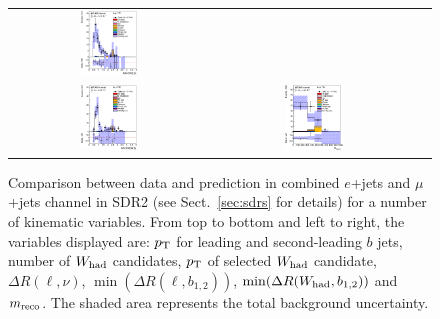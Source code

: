 \begin{figure}[htbp]
\begin{center}
\begin{tabular}{ccc}
\includegraphics[width=0.30\textwidth]{appendices/figures/sdrs/VLQAna_WbX_MinDRlb_ELEMUONCR1_1W_NOMINAL.eps} \\
\includegraphics[width=0.30\textwidth]{appendices/figures/sdrs/VLQAna_WbX_MinDRWb_ELEMUONCR1_1W_NOMINAL.eps} &
\includegraphics[width=0.30\textwidth]{appendices/figures/sdrs/VLQAna_WbX_1W_MWb_4_ELEMUONCR1_1W_NOMINAL.eps} & \\
\end{tabular}\caption{\small {Comparison between data and prediction in combined $e$+jets and $\mu$+jets channel in SDR2 (see Sect.~\ref{sec:sdrs} for details) 
for a number of kinematic variables. From top to bottom and left to right, the variables displayed are: $\pt$ for leading and second-leading $b$ jets,
number of $W_{\rm had}$  candidates, $\pt$ of selected $W_{\rm had}$  candidate, $\Delta R(\ell,\nu)$, $\min(\Delta R(\ell, b_{1,2}))$, 
$\min(\Delta R(W_{\rm had}, b_{1,2}))$ and $m_{\rm reco}$.
The shaded area represents the total background uncertainty.}}
\label{fig:ELEMUONCR1_3}
\end{center}
\end{figure}                                                                             
